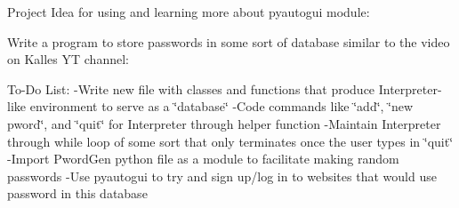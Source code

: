Project Idea for using and learning more about pyautogui module\+:

Write a program to store passwords in some sort of database similar to the video on Kalle\textquotesingle{}s YT channel\+:

To-\/\+Do List\+: -\/Write new file with classes and functions that produce Interpreter-\/like environment to serve as a \char`\"{}database\char`\"{} -\/Code commands like \char`\"{}add\char`\"{}, \char`\"{}new pword\char`\"{}, and \char`\"{}quit\char`\"{} for Interpreter through helper function -\/Maintain Interpreter through while loop of some sort that only terminates once the user types in \char`\"{}quit\char`\"{} -\/Import Pword\+Gen python file as a module to facilitate making random passwords -\/Use pyautogui to try and sign up/log in to websites that would use password in this database 